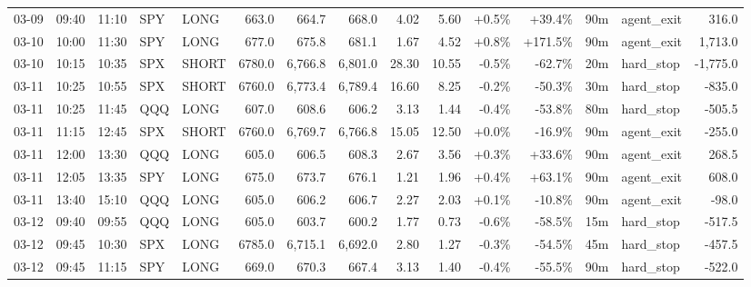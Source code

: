 \documentclass[11pt,a4paper,twoside]{article}
\begin{document}
\begin{landscape}
\begin{center}
\begin{longtable}{>{\color{txtmain}}l l l l l r r r r r r r r >{\color{txtmain}}l r}
03-09 & 09:40 & 11:10 & SPY & LONG & 663.0 & 664.7 & 668.0 & 4.02 & 5.60 & \textcolor{wingreen}{+0.5\%} & \textcolor{wingreen}{+39.4\%} & 90m & agent\_exit & \textcolor{wingreen}{316.0} \\
03-10 & 10:00 & 11:30 & SPY & LONG & 677.0 & 675.8 & 681.1 & 1.67 & 4.52 & \textcolor{wingreen}{+0.8\%} & \textcolor{wingreen}{+171.5\%} & 90m & agent\_exit & \textcolor{wingreen}{1,713.0} \\
03-10 & 10:15 & 10:35 & SPX & SHORT & 6780.0 & 6,766.8 & 6,801.0 & 28.30 & 10.55 & \textcolor{lossred}{-0.5\%} & \textcolor{lossred}{-62.7\%} & 20m & hard\_stop & \textcolor{lossred}{-1,775.0} \\
03-11 & 10:25 & 10:55 & SPX & SHORT & 6760.0 & 6,773.4 & 6,789.4 & 16.60 & 8.25 & \textcolor{lossred}{-0.2\%} & \textcolor{lossred}{-50.3\%} & 30m & hard\_stop & \textcolor{lossred}{-835.0} \\
03-11 & 10:25 & 11:45 & QQQ & LONG & 607.0 & 608.6 & 606.2 & 3.13 & 1.44 & \textcolor{lossred}{-0.4\%} & \textcolor{lossred}{-53.8\%} & 80m & hard\_stop & \textcolor{lossred}{-505.5} \\
03-11 & 11:15 & 12:45 & SPX & SHORT & 6760.0 & 6,769.7 & 6,766.8 & 15.05 & 12.50 & \textcolor{wingreen}{+0.0\%} & \textcolor{lossred}{-16.9\%} & 90m & agent\_exit & \textcolor{lossred}{-255.0} \\
03-11 & 12:00 & 13:30 & QQQ & LONG & 605.0 & 606.5 & 608.3 & 2.67 & 3.56 & \textcolor{wingreen}{+0.3\%} & \textcolor{wingreen}{+33.6\%} & 90m & agent\_exit & \textcolor{wingreen}{268.5} \\
03-11 & 12:05 & 13:35 & SPY & LONG & 675.0 & 673.7 & 676.1 & 1.21 & 1.96 & \textcolor{wingreen}{+0.4\%} & \textcolor{wingreen}{+63.1\%} & 90m & agent\_exit & \textcolor{wingreen}{608.0} \\
03-11 & 13:40 & 15:10 & QQQ & LONG & 605.0 & 606.2 & 606.7 & 2.27 & 2.03 & \textcolor{wingreen}{+0.1\%} & \textcolor{lossred}{-10.8\%} & 90m & agent\_exit & \textcolor{lossred}{-98.0} \\
03-12 & 09:40 & 09:55 & QQQ & LONG & 605.0 & 603.7 & 600.2 & 1.77 & 0.73 & \textcolor{lossred}{-0.6\%} & \textcolor{lossred}{-58.5\%} & 15m & hard\_stop & \textcolor{lossred}{-517.5} \\
03-12 & 09:45 & 10:30 & SPX & LONG & 6785.0 & 6,715.1 & 6,692.0 & 2.80 & 1.27 & \textcolor{lossred}{-0.3\%} & \textcolor{lossred}{-54.5\%} & 45m & hard\_stop & \textcolor{lossred}{-457.5} \\
03-12 & 09:45 & 11:15 & SPY & LONG & 669.0 & 670.3 & 667.4 & 3.13 & 1.40 & \textcolor{lossred}{-0.4\%} & \textcolor{lossred}{-55.5\%} & 90m & hard\_stop & \textcolor{lossred}{-522.0} \\

\end{longtable}
\end{center}
\end{landscape}
\end{document}
